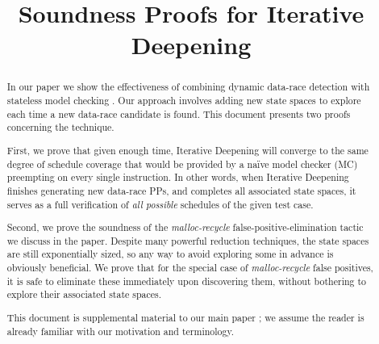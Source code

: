 \documentclass[10pt,times,numbers]{../sigplanconf}
\begin{document}
%
%

\newcommand\quicksand{\textsc{Quicksand}}
\newcommand\simics{\textsc{Simics}}
\newcommand{\sect}[1]{\S #1}
\newcommand\hilight[2]{\color{#1}#2\color{black}}

\title{Soundness Proofs for Iterative Deepening}

\maketitle
\begin{abstract}
In our paper we show the effectiveness of combining dynamic data-race detection \cite{eraser,hybriddatarace} with stateless model checking \cite{verisoft,dpor}.
Our approach involves adding new state spaces to explore each time a new data-race candidate is found.
This document presents two proofs concerning the technique.

First, we prove that given enough time, Iterative Deepening will converge to the same degree of schedule coverage that would be provided by a na\"{i}ve model checker (MC) preempting on every single instruction.
In other words, when Iterative Deepening finishes generating new data-race PPs, and completes all associated state spaces,
it serves as a full verification of {\em all possible} schedules of the given test case.

Second, we prove the soundness of the {\em malloc-recycle} false-positive-elimination tactic we discuss in the paper.
Despite many powerful reduction techniques, the state spaces are still exponentially sized,
so any way to avoid exploring some in advance is obviously beneficial.
We prove that for the special case of {\em malloc-recycle} false positives, it is safe to eliminate these immediately upon discovering them, without bothering to explore their associated state spaces.


	This document is supplemental material to our main paper \cite{quicksand}; we assume the reader is already familiar with our motivation and terminology.
\end{abstract}
\end{document}
